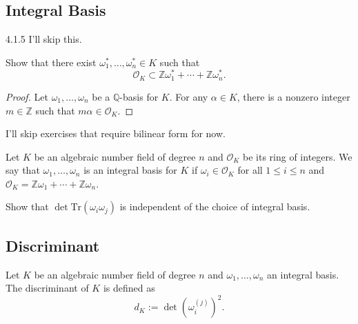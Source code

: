 \newpage
\subsection{Integral Basis}


\begin{example}
    4.1.5 I'll skip this.
\end{example}

\begin{example}
    Show that there exist \(\omega_1^*, \ldots, \omega_n^* \in K\) such that
    \begin{equation*}
        \mathcal{O}_K \subset \mathbb{Z}\omega_1^* + \cdots + \mathbb{Z} \omega_n^* \text{.}
    \end{equation*}
\end{example}
\begin{proof}
    Let \(\omega_1, \ldots, \omega_n\) be a \(\mathbb{Q}\)-basis for \(K\). For any \(\alpha \in K\), there is a nonzero integer \(m \in \mathbb{Z}\) such that \(m \alpha \in \mathcal{O}_K\).
\end{proof}

I'll skip exercises that require bilinear form for now.

\begin{defbox}
    \begin{definition}
        Let \(K\) be an algebraic number field of degree \(n\) and \(\mathcal{O}_K\) be its ring of integers. We say that \(\omega_1, \ldots, \omega_n\) is an integral basis for \(K\) if \(\omega_i \in \mathcal{O}_K\) for all \(1 \leq i \leq n\) and \(\mathcal{O}_K = \mathbb{Z}\omega_1 + \cdots + \mathbb{Z}\omega_n\).
    \end{definition}
\end{defbox}

\begin{example}
    Show that \(\det{\mathrm{Tr}(\omega_i \omega_j)}\) is independent of the choice of integral basis.
\end{example}

\newpage
\subsection{Discriminant}

\begin{defbox}
    \begin{definition}[Discriminant]
        Let \(K\) be an algebraic number field of degree \(n\) and \(\omega_1, \ldots, \omega_n\) an integral basis. The discriminant of \(K\) is defined as
        \begin{equation*}
            d_K := \det\left(\omega_i^{(j)}\right)^2 \text{.}
        \end{equation*}
    \end{definition}
\end{defbox}

